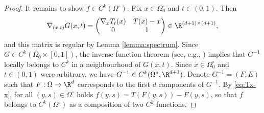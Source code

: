 \begin{proof}
{        It remains to show $f\in C^k(\Omega^\circ)$. Fix
        $x\in \Omega_0^\circ$ and $t\in (0,1)$. Then
        \begin{equation*}
          \nabla_{(x,t)}G(x,t)=\begin{pmatrix}
            \nabla_x T_t(x) & T(x) - x \\
            0 & 1
            \end{pmatrix}\in\R^{(d+1)\times (d+1)},
          \end{equation*}
          and this matrix is regular by Lemma
          \ref{lemma:spectrum}. Since
          $G\in C^k(\Omega_0\times [0,1])$, the inverse function
          theorem (see, e.g., ) implies that $G^{-1}$ locally
          belongs to $C^k$ in a neighbourhood of $G(x,t)$. Since
          $x\in\Omega_0^\circ$ and $t\in (0,1)$ were arbitrary, we
          have $G^{-1}\in C^k(\Omega^\circ,\R^{d+1})$. Denote
          $G^{-1}=(F,E)$ such that $F:\Omega\to\R^d$ corresponds
          to the first $d$ components of $G^{-1}$.  By
          \eqref{eq:Tx-x}, for all $(y,s)\in\Omega^\circ$ holds
          $f(y,s)=T(F(y,s))-F(y,s)$, so that $f$ belongs to
          $C^k(\Omega^\circ)$ as a composition of two $C^k$ functions.}
\end{proof}

